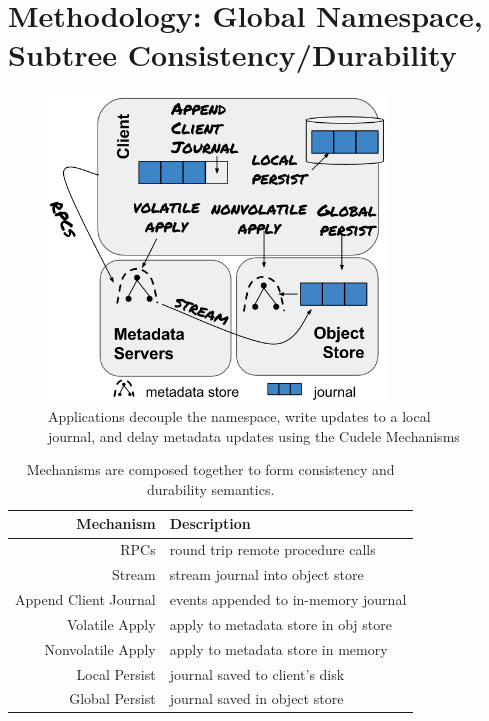 \section{Methodology: Global Namespace, Subtree Consistency/Durability}
\label{sec:methodology-decoupled-namespaces}

\begin{figure}[tb]
\centering
\includegraphics[width=90mm]{figures/fig-decouple.png}
\caption{Applications decouple the namespace, write updates to a local journal,
and delay metadata updates using the Cudele Mechanisms }\label{fig:decouple}
\end{figure}

\begin{table}
\begin{tabular}{ r | l }
  Mechanism         & Description \\\hline
  RPCs              & round trip remote procedure calls \\
  Stream            & stream journal into object store \\
  Append Client Journal & events appended to in-memory journal \\
  Volatile Apply    & apply to metadata store in obj store \\
  Nonvolatile Apply & apply to metadata store in memory \\
  Local Persist     & journal saved to client's disk \\
  Global Persist    & journal saved in object store \\
\end{tabular}
\caption{Mechanisms are composed together to form consistency and
durability semantics.\label{table:mechanisms}} 
\end{table}

